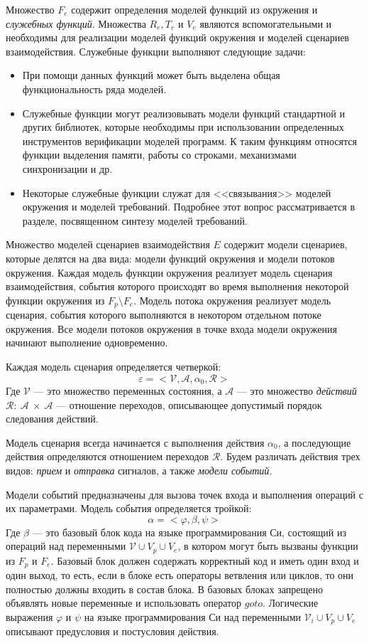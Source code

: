 Множество $F_e$ содержит определения моделей функций из окружения и \textit{служебных функций}.
Множества $R_e, T_e$ и $V_e$ являются вспомогательными и необходимы для реализации моделей функций окружения и моделей сценариев взаимодействия.
Служебные функции выполняют следующие задачи:
\begin{itemize}
    \item При помощи данных функций может быть выделена общая функциональность ряда моделей.
    \item Служебные функции могут реализовывать модели функций стандартной и других библиотек, которые необходимы при использовании определенных инструментов верификации моделей программ.
    К таким функциям относятся функции выделения памяти, работы со строками, механизмами синхронизации и др.
    \item Некоторые служебные функции служат для <<связывания>> моделей окружения и моделей требований. Подробнее этот вопрос рассматривается в разделе, посвященном синтезу моделей требований.
\end{itemize}

Множество моделей сценариев взаимодействия $E$ содержит модели сценариев, которые делятся на два вида: модели функций окружения и модели потоков окружения. 
Каждая модель функции окружения реализует модель сценария взаимодействия, события которого происходят во время выполнения некоторой функции окружения из $F_p \setminus F_e$. 
Модель потока окружения реализует модель сценария, события которого выполняются
в некотором отдельном потоке окружения.
Все модели потоков окружения в точке входа модели окружения начинают выполнение одновременно.

Каждая модель сценария определяется четверкой:
\[ \varepsilon = <\mathcal{V}, \mathcal{A}, \alpha_0 ,\mathcal{R}>\]
Где $\mathcal{V}$ --- это множество переменных состояния, а $\mathcal{A}$ --- это множество \textit{действий} $\mathcal{R}:~ \mathcal{A}~\times~\mathcal{A}$ --- отношение переходов, описывающее допустимый порядок следования действий.

Модель сценария всегда начинается с выполнения действия $\alpha_0$, а последующие действия определяются отношением переходов $\mathcal{R}$. 
Будем различать действия трех видов: \textit{прием} и \textit{отправка} сигналов, а также \textit{модели событий}.

Модели событий предназначены для вызова точек входа и выполнения операций с их параметрами.
Модель события определяется тройкой:
\[\alpha = <\varphi, \beta, \psi> \]
Где $\beta$ --- это базовый блок кода на языке программирования Си, состоящий из операций над переменными $\mathcal{V} \cup V_p \cup V_e$, в котором могут быть вызваны функции из $F_p$ и $F_e$.
Базовый блок должен содержать корректный код и иметь один вход и один выход, то есть, если в блоке есть операторы ветвления или циклов, то они полностью должны входить в состав блока.
В базовых блоках запрещено объявлять новые переменные и использовать оператор $goto$.
Логические выражения $\varphi$ и $\psi$ на языке программирования Си над переменными $\mathcal{V}_i \cup V_p \cup V_e$ описывают предусловия и постусловия действия.

